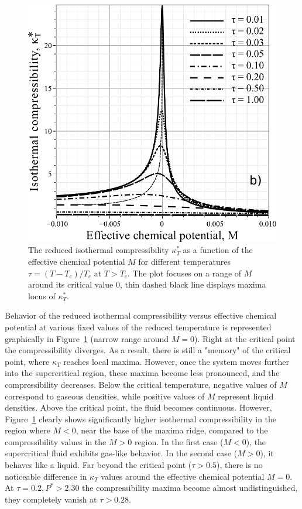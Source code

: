 \begin{figure}[h!] 
	\centering \includegraphics[width=\column]{f3bb.pdf}
	\vskip-3mm
	\caption{The reduced isothermal compressibility $\kappa^*_T$ as a function of the effective chemical potential $M$ for different temperatures $\tau = (T - T_c)/T_c$ at $T > T_c$. The plot focuses on a range of $M$ around its critical value $0$, thin dashed black line displays maxima locus of $\kappa^*_T$.
	}
	\label{fig3}
\end{figure}
Behavior of the reduced isothermal compressibility versus effective chemical potential at various fixed values of the reduced temperature is represented graphically in Figure~\ref{fig3} (narrow range around $M=0$). Right at the critical point the compressibility diverges. As a result, there is still a "memory" of the critical point, where $\kappa_T$ reaches local maxima. However, once the system moves further into the supercritical region, these maxima become less pronounced, and the compressibility decreases. 
Below the critical temperature, negative values of $M$ correspond to gaseous densities, while positive values of $M$ represent liquid densities. Above the critical point, the fluid becomes continuous. However, Figure~\ref{fig3} clearly shows significantly higher isothermal compressibility in the region where $M<0$, near the base of the maxima ridge, compared to the compressibility values in the $M>0$ region. In the first case ($M<0$), the supercritical fluid exhibits gas-like behavior. In the second case ($M>0$), it behaves like a liquid. Far beyond the critical point ($\tau > 0.5$), there is no noticeable difference in $\kappa_T$ values around the effective chemical potential $M=0$. At $\tau = 0.2, P^*>2.30$ the compressibility maxima become almost undistinguished, they completely vanish at $\tau > 0.28$. 
